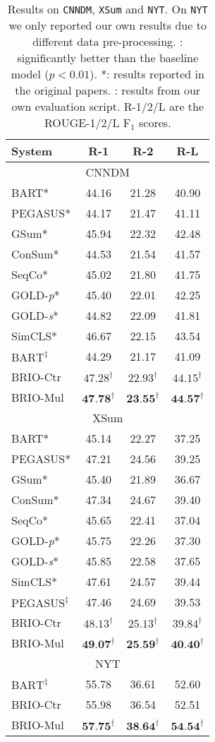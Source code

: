 \documentclass[11pt]{article}
\newcommand{\model}{BRIO\xspace}
\begin{document}
\begin{table}[t!]
\centering
\small
\begin{tabular}{lccc}
\toprule
\textbf{System} & \textbf{R-1} & \textbf{R-2} & \textbf{R-L}  \\
\midrule
\multicolumn{4}{c}{CNNDM} \\
\midrule
 BART* & 44.16 & 21.28 & 40.90 \\
 
 PEGASUS* & 44.17 & 21.47 & 41.11  \\
 GSum* & 45.94 & 22.32 & 42.48 \\
 ConSum* & 44.53 & 21.54 & 41.57 \\
 SeqCo* & 45.02 & 21.80 & 41.75 \\
 GOLD-\textit{p}* & 45.40 & 22.01 & 42.25 \\
 GOLD-\textit{s}* & 44.82 & 22.09 & 41.81 \\
 SimCLS* & 46.67 & 22.15 & 43.54 \\
 $\textrm{BART}^\ddag$ & 44.29 & 21.17 & 41.09 \\
\midrule
 \model-Ctr & $47.28^\dag$ & $22.93^\dag$ & $44.15^\dag$ \\
 \model-Mul & $\textbf{47.78}^\dag$ & $\textbf{23.55}^\dag$ & $\textbf{44.57}^\dag$ \\
\midrule
\multicolumn{4}{c}{XSum} \\
\midrule
 BART* & 45.14 & 22.27 & 37.25 \\
 PEGASUS* & 47.21 & 24.56 & 39.25 \\
 GSum* & 45.40 & 21.89 & 36.67 \\
 ConSum* & 47.34 & 24.67 & 39.40 \\
 SeqCo* & 45.65 & 22.41 & 37.04 \\
 GOLD-\textit{p}* & 45.75 & 22.26 & 37.30 \\
 GOLD-\textit{s}* & 45.85 & 22.58 & 37.65 \\
 SimCLS* & 47.61 & 24.57 & 39.44 \\
 $\textrm{PEGASUS}^\ddag$ & 47.46 & 24.69 & 39.53 \\
\midrule
 \model-Ctr & $48.13^\dag$ & $25.13^\dag$ & $39.84^\dag$ \\
 \model-Mul & $\textbf{49.07}^\dag$ & $\textbf{25.59}^\dag$ & $\textbf{40.40}^\dag$ \\
\midrule
\multicolumn{4}{c}{NYT} \\
\midrule
 $\textrm{BART}^\ddag$  & 55.78 & 36.61 & 52.60 \\
\midrule
\model-Ctr & 55.98 & 36.54 & 52.51 \\
 \model-Mul & $\textbf{57.75}^\dag$ & $\textbf{38.64}^\dag$ & $\textbf{54.54}^\dag$ \\
\bottomrule
\end{tabular}
\caption{\label{tab:other} Results on \texttt{CNNDM}, \texttt{XSum} and \texttt{NYT}.
On \texttt{NYT} we only reported our own results due to different data pre-processing.
\dag: significantly better than the baseline model ($p < 0.01$).
*: results reported in the original papers.
\ddag: results from our own evaluation script.
R-1/2/L are the ROUGE-1/2/L F$_1$ scores.}
\end{table}
\end{document}
